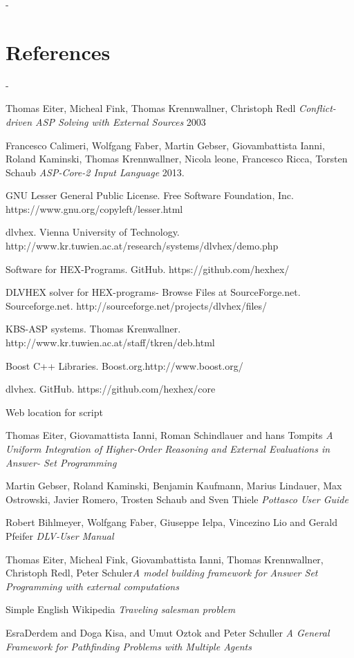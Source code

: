 \documentclass[14pt,a4paper, titlepage]{article}
\begin{document}
 \newpage
-\section{References}
-\begin{thebibliography}{1}
 Thomas Eiter, Micheal Fink, Thomas 
Krennwallner, Christoph Redl {\em Conflict-driven ASP 
Solving with External Sources} 2003   
  
 Francesco Calimeri, Wolfgang Faber, Martin 
Gebser, Giovambattista Ianni, Roland Kaminski, Thomas 
Krennwallner, Nicola leone, Francesco Ricca, Torsten Schaub 
{\em ASP-Core-2 Input Language} 2013.

 GNU Lesser General Public License. Free 
Software Foundation, Inc. 
https://www.gnu.org/copyleft/lesser.html 

dlvhex. Vienna University of 
Technology. 
http://www.kr.tuwien.ac.at/research/systems/dlvhex/demo.php 

Software for HEX-Programs. GitHub. 
https://github.com/hexhex/ 

DLVHEX solver for HEX-programs-  
Browse Files at SourceForge.net. Sourceforge.net. 
http://sourceforge.net/projects/dlvhex/files/

KBS-ASP systems. Thomas Krenwallner. 
http://www.kr.tuwien.ac.at/staff/tkren/deb.html

Boost C++ Libraries. 
Boost.org.http://www.boost.org/

% 
%
 
dlvhex. GitHub. 
https://github.com/hexhex/core

Web location for script

Thomas Eiter, Giovamattista Ianni, Roman 
Schindlauer and hans Tompits {\em A Uniform Integration of 
Higher-Order Reasoning and External Evaluations in Answer-
Set Programming} 


Martin Gebser, Roland Kaminski, Benjamin 
Kaufmann, Marius Lindauer, Max Ostrowski, Javier Romero, 
Trosten Schaub and Sven Thiele {\em Pottasco User Guide}

Robert Bihlmeyer, Wolfgang Faber, Giuseppe 
Ielpa, Vincezino Lio and Gerald Pfeifer {\em DLV-User 
Manual} 

Thomas Eiter, Micheal Fink, Giovambattista 
Ianni, Thomas Krennwallner, Christoph Redl, Peter 
Schuler{\em A model building framework for Answer Set 
Programming with external computations} 

 Simple English Wikipedia {\em Traveling 
salesman problem}

 EsraDerdem and Doga Kisa, and Umut 
Oztok and Peter Schuller {\em A General Framework for  
Pathfinding Problems with Multiple Agents}
\end{thebibliography} 
\end{document}
